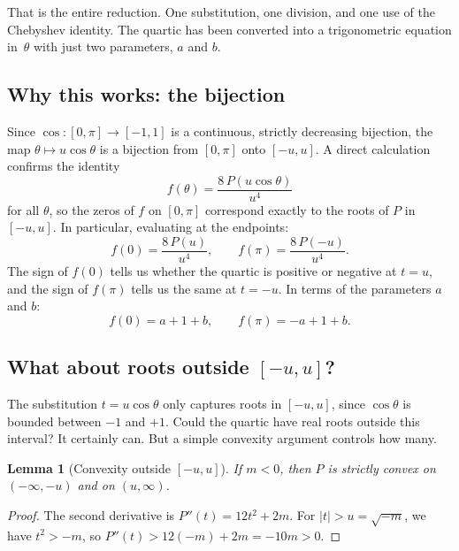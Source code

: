 \documentclass[12pt]{article}
\newtheorem{lemma}[theorem]{Lemma}
\theoremstyle{definition}
\theoremstyle{remark}
\begin{document}
That is the entire reduction. One substitution, one division, and one use of the Chebyshev identity. The quartic has been converted into a trigonometric equation in~$\theta$ with just two parameters, $a$ and $b$.

\subsection{Why this works: the bijection}

Since $\cos\colon [0,\pi] \to [-1,1]$ is a continuous, strictly decreasing bijection, the map $\theta \mapsto u\cos\theta$ is a bijection from $[0,\pi]$ onto $[-u, u]$. A direct calculation confirms the identity
\begin{equation}\label{eq:fP}
f(\theta) = \frac{8\,P(u\cos\theta)}{u^4}
\end{equation}
for all $\theta$, so the zeros of $f$ on $[0,\pi]$ correspond exactly to the roots of $P$ in $[-u, u]$. In particular, evaluating at the endpoints:
\begin{equation}\label{eq:boundary}
f(0) = \frac{8\,P(u)}{u^4}, \qquad f(\pi) = \frac{8\,P(-u)}{u^4}.
\end{equation}
The sign of $f(0)$ tells us whether the quartic is positive or negative at $t = u$, and the sign of $f(\pi)$ tells us the same at $t = -u$. In terms of the parameters $a$ and $b$:
\begin{equation}\label{eq:boundary_vals}
f(0) = a + 1 + b, \qquad f(\pi) = -a + 1 + b.
\end{equation}

\subsection{What about roots outside $[-u,u]$?}

The substitution $t = u\cos\theta$ only captures roots in $[-u,u]$, since $\cos\theta$ is bounded between $-1$ and $+1$. Could the quartic have real roots outside this interval? It certainly can. But a simple convexity argument controls how many.

\begin{lemma}[{Convexity outside $[-u,u]$}]\label{lem:convex}
If $m < 0$, then $P$ is strictly convex on $(-\infty, -u)$ and on $(u, \infty)$.
\end{lemma}

\begin{proof}
The second derivative is $P''(t) = 12t^2 + 2m$. For $|t| > u = \sqrt{-m}$, we have $t^2 > -m$, so $P''(t) > 12(-m) + 2m = -10m > 0$.
\end{proof}
\end{document}
